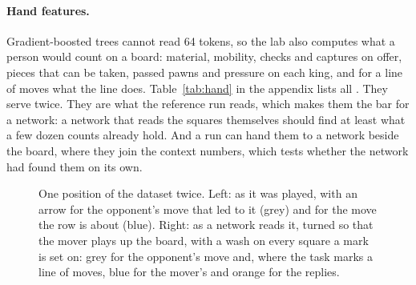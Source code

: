 \paragraph{Hand features.}
Gradient-boosted trees cannot read 64 tokens, so the lab also computes what a
person would count on a board: material, mobility, checks and captures on
offer, pieces that can be taken, passed pawns and pressure on each king, and
for a line of moves what the line does. Table~\ref{tab:hand} in the appendix
lists all . They serve twice. They are what the reference
run reads, which makes them the bar for a network: a network that reads the
squares themselves should find at least what a few dozen counts already hold.
And a run can hand them to a network beside the board, where they join the
context numbers, which tests whether the network had found them on its own.

\begin{table}[htbp]\centering\small
{}
\caption{The context numbers: what every learner reads beside the board.}
\label{tab:reads}
\end{table}
\fi

\begin{table}[htbp]\centering\small
{}
\caption{The marks: what the task tells a network about squares. A square
is always given as the mover sees it, after the board is turned.}
\label{tab:marks}
\end{table}

\iflook
\begin{figure}[htbp]\centering
{}
\ifsequence
\caption{One position of one row of the dataset twice: the position before
the player's costliest move of the game. Left: as it was played, with an
arrow for the opponent's move that led to it (grey) and for the player's move
(blue). Right: as a network reads it, turned so that the mover plays up the
board, with a wash on every square a mark is set on: grey for the opponent's
move and blue for the player's own. A network reads every position of the
row this way.}
\else
\caption{One position of the dataset twice. Left: as it was played, with an
arrow for the opponent's move that led to it (grey) and for the move the row
is about (blue). Right: as a network reads it, turned so that the mover plays
up the board, with a wash on every square a mark is set on: grey for the
opponent's move and, where the task marks a line of moves, blue for the
mover's and orange for the replies.}
\fi
\label{fig:encoding}
\end{figure}
\fi
